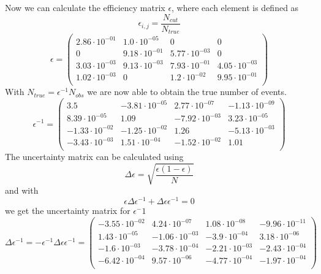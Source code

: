 \documentclass[]{article}
\begin{document}
\newline
Now we can calculate the efficiency matrix $\epsilon$, where each element is defined as 
\begin{equation}
\epsilon_{i,j} = \frac{N_{cut}}{N_{true}}
\end{equation}
\begin{equation}
\epsilon=\begin{pmatrix}
   2.86\cdot 10^{-01} & 1.0\cdot 10^{-05} & 0 & 0 \\
   0 & 9.18\cdot 10^{-01} & 5.77\cdot 10^{-03} & 0 \\
   3.03\cdot 10^{-03} & 9.13\cdot 10^{-03} & 7.93\cdot 10^{-01} & 4.05\cdot 10^{-03} \\
   1.02\cdot 10^{-03} & 0 & 1.2\cdot 10^{-02} & 9.95\cdot 10^{-01} \\
\end{pmatrix}
\end{equation}
With $N_{true} = \epsilon^{-1} N_{obs}$ we are now able to obtain the true number of events.
\begin{equation}
\epsilon^{-1}=\begin{pmatrix}
   3.5 & -3.81\cdot 10^{-05} & 2.77\cdot 10^{-07} & -1.13\cdot 10^{-09} \\
   8.39\cdot 10^{-05} & 1.09 & -7.92\cdot 10^{-03} & 3.23\cdot 10^{-05} \\
   -1.33\cdot 10^{-02} & -1.25\cdot 10^{-02} & 1.26 & -5.13\cdot 10^{-03} \\
   -3.43\cdot 10^{-03} & 1.51\cdot 10^{-04} & -1.52\cdot 10^{-02} & 1.01 \\
\end{pmatrix}
\end{equation}
The uncertainty matrix can be calculated using
\begin{equation}
\Delta \epsilon = \sqrt{\frac{\epsilon(1-\epsilon)}{N}}
\end{equation}
and with
\begin{equation}
\epsilon\Delta\epsilon^{-1}+\Delta\epsilon\epsilon^{-1}=0
\end{equation}
we get the uncertainty matrix for $\epsilon^-1$
\begin{equation}
\Delta\epsilon^{-1} = -\epsilon^{-1}\Delta\epsilon\epsilon^{-1} = \begin{pmatrix}
   -3.55 \cdot 10^{-02} & 4.24 \cdot 10^{-07} & 1.08 \cdot 10^{-08} & -9.96 \cdot 10^{-11} \\
   1.43 \cdot 10^{-05} & -1.06 \cdot 10^{-03} & -3.9 \cdot 10^{-04} & 3.18 \cdot 10^{-06} \\
   -1.6 \cdot 10^{-03} & -3.78 \cdot 10^{-04} & -2.21 \cdot 10^{-03} & -2.43 \cdot 10^{-04} \\
   -6.42 \cdot 10^{-04} & 9.57 \cdot 10^{-06} & -4.77 \cdot 10^{-04} & -1.97 \cdot 10^{-04} \\
\end{pmatrix}
\end{equation}
\end{document}
